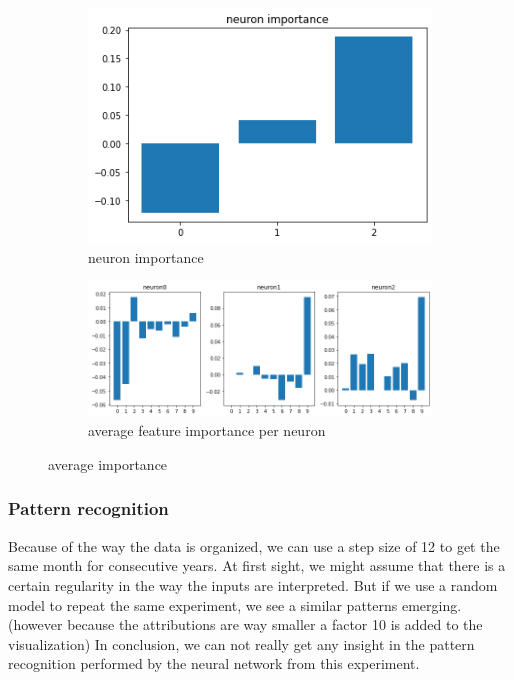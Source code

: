 \documentclass{article}
\begin{document}
\begin{figure}[h!]
     \centering
     \begin{subfigure}[b]{0.2\textwidth}
         \centering
         \includegraphics[scale=0.4]{linear_model_avg_neuron_importance.png}
         \caption{neuron importance}
         \label{fig:lin_model_ani}
     \end{subfigure}
     \hspace*{\fill}
     \begin{subfigure}[b]{0.4\textwidth}
         \centering
         \includegraphics[scale=0.4]{linear_model_avg_feature_per_neuron_importance.png}
         \caption{average feature importance per neuron}
         \label{fig:lin_model_anfi}
     \end{subfigure}
     \hspace*{\fill}
        \caption{average importance}
        \label{fig:lin_model_a_f_i}
\end{figure}


\subsubsection{Pattern recognition}

Because of the way the data is organized, we can use a step size of 12 to get the same month for consecutive years. At first sight, we might assume that there is a certain regularity in the way the inputs are interpreted. But if we use a random model to repeat the same experiment, we see a similar patterns emerging. (however because the attributions are way smaller a factor 10 is added to the visualization) In conclusion, we can not really get any insight in the pattern recognition performed by the neural network from this experiment.
\end{document}
